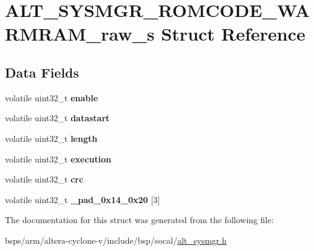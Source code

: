 \hypertarget{structALT__SYSMGR__ROMCODE__WARMRAM__raw__s}{}\section{A\+L\+T\+\_\+\+S\+Y\+S\+M\+G\+R\+\_\+\+R\+O\+M\+C\+O\+D\+E\+\_\+\+W\+A\+R\+M\+R\+A\+M\+\_\+raw\+\_\+s Struct Reference}
\label{structALT__SYSMGR__ROMCODE__WARMRAM__raw__s}
\subsection*{Data Fields}
\begin{DoxyCompactItemize}
\item 
\mbox{\label{structALT__SYSMGR__ROMCODE__WARMRAM__raw__s_af1ac3a70ad74e19fe800bfd622208491}} 
volatile uint32\+\_\+t {\bfseries enable}
\item 
\mbox{\label{structALT__SYSMGR__ROMCODE__WARMRAM__raw__s_a7f951a66513b5739223a2059dbb5791a}} 
volatile uint32\+\_\+t {\bfseries datastart}
\item 
\mbox{\label{structALT__SYSMGR__ROMCODE__WARMRAM__raw__s_a0a840ff931a095a600a4439146cbf4ca}} 
volatile uint32\+\_\+t {\bfseries length}
\item 
\mbox{\label{structALT__SYSMGR__ROMCODE__WARMRAM__raw__s_ab3b191cdc6bd74eecb22ed8443406d4b}} 
volatile uint32\+\_\+t {\bfseries execution}
\item 
\mbox{\label{structALT__SYSMGR__ROMCODE__WARMRAM__raw__s_a7d3513815f780c721015f119c1167f75}} 
volatile uint32\+\_\+t {\bfseries crc}
\item 
\mbox{\label{structALT__SYSMGR__ROMCODE__WARMRAM__raw__s_aa61816c8ff3771eadc4ced206696d8d7}} 
volatile uint32\+\_\+t {\bfseries \+\_\+pad\+\_\+0x14\+\_\+0x20} \mbox{[}3\mbox{]}
\end{DoxyCompactItemize}


The documentation for this struct was generated from the following file\+:\begin{DoxyCompactItemize}
\item 
bsps/arm/altera-\/cyclone-\/v/include/bsp/socal/\mbox{\hyperlink{alt__sysmgr_8h}{alt\+\_\+sysmgr.\+h}}\end{DoxyCompactItemize}

